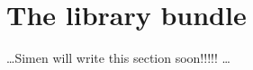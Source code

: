 \section{The {\lsdalton} library bundle}
\label{sec:LSlib}

\dots Simen will write this section soon!!!!! \dots




